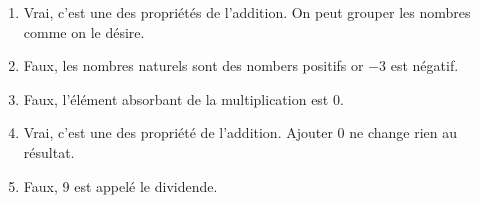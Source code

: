 %
%
    \begin{enumerate}
        \item Vrai, c'est une des propriétés de l'addition. On peut grouper les nombres comme on le désire.
        \item Faux, les nombres naturels sont des nombers positifs or $-3$ est négatif.
        \item Faux, l'élément absorbant de la multiplication est 0.
        \item Vrai, c'est une des propriété de l'addition. Ajouter 0 ne change rien au résultat.
        \item Faux, 9 est appelé le dividende.
    \end{enumerate}
